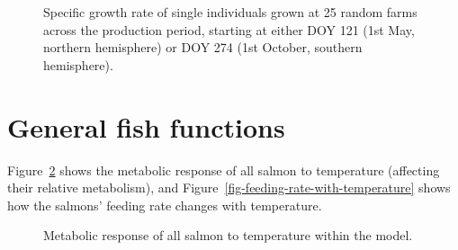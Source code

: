 \documentclass[
  a4paper,
]{article}
\begin{document}
\begin{figure}


\caption{\label{fig-ref-SGR}Specific growth rate of single individuals
grown at 25 random farms across the production period, starting at
either DOY 121 (1st May, northern hemisphere) or DOY 274 (1st October,
southern hemisphere).}

\end{figure}%

\section{General fish functions}\label{general-fish-functions}

Figure~\ref{fig-functional-response-to-temperature} shows the metabolic
response of all salmon to temperature (affecting their relative
metabolism), and Figure~\ref{fig-feeding-rate-with-temperature} shows
how the salmons' feeding rate changes with temperature.

\begin{figure}


\caption{\label{fig-functional-response-to-temperature}Metabolic
response of all salmon to temperature within the model.}

\end{figure}%
\end{document}
